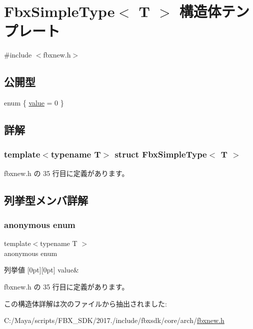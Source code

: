 \hypertarget{struct_fbx_simple_type}{}\section{Fbx\+Simple\+Type$<$ T $>$ 構造体テンプレート}
\label{struct_fbx_simple_type}


{\ttfamily \#include $<$fbxnew.\+h$>$}

\subsection*{公開型}
\begin{DoxyCompactItemize}
\item 
enum \{ \hyperlink{struct_fbx_simple_type_a747f3fbe3f4a82173bf2b4175e9ff3b8ad40f5f2bb903bccac4fda9add1925e2f}{value} = 0
 \}
\end{DoxyCompactItemize}


\subsection{詳解}
\subsubsection*{template$<$typename T$>$\newline
struct Fbx\+Simple\+Type$<$ T $>$}



 fbxnew.\+h の 35 行目に定義があります。



\subsection{列挙型メンバ詳解}
\mbox{\label{struct_fbx_simple_type_a747f3fbe3f4a82173bf2b4175e9ff3b8}} 
\subsubsection{\texorpdfstring{anonymous enum}{anonymous enum}}
{\footnotesize\ttfamily template$<$typename T $>$ \\
anonymous enum}

\begin{DoxyEnumFields}{列挙値}
[0pt][0pt]{}\mbox{\label{struct_fbx_simple_type_a747f3fbe3f4a82173bf2b4175e9ff3b8ad40f5f2bb903bccac4fda9add1925e2f}} 
value&\\
\hline

\end{DoxyEnumFields}


 fbxnew.\+h の 35 行目に定義があります。



この構造体詳解は次のファイルから抽出されました\+:\begin{DoxyCompactItemize}
\item 
C\+:/\+Maya/scripts/\+F\+B\+X\+\_\+\+S\+D\+K/2017./include/fbxsdk/core/arch/\hyperlink{fbxnew_8h}{fbxnew.\+h}\end{DoxyCompactItemize}
